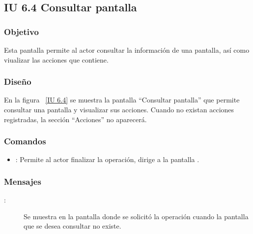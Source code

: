 \subsection{IU 6.4 Consultar pantalla}

\subsubsection{Objetivo}
	
	Esta pantalla permite al actor consultar la información de una pantalla, así como viualizar las acciones que contiene.

\subsubsection{Diseño}

    En la figura ~\ref{IU 6.4} se muestra la pantalla ``Consultar pantalla'' que permite consultar una pantalla y visualizar sus acciones. Cuando no existan acciones registradas, la sección ``Acciones'' no aparecerá. \\



\subsubsection{Comandos}
\begin{itemize}
	\item {}: Permite al actor finalizar la operación, dirige a la pantalla .
\end{itemize}

\subsubsection{Mensajes}
	
\begin{description}
	\item[:] Se muestra en la pantalla donde se solicitó la operación cuando la pantalla que se desea consultar no existe.
\end{description}
